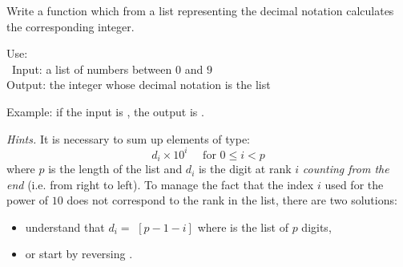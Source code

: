 \documentclass[11pt,class=report,crop=false]{standalone}
\begin{document}


\begin{activite}


Write a function  which from a list representing the decimal notation calculates the corresponding integer.
  
  \begin{fonction}
  Use:  \\\
  Input: a list of numbers between $0$ and $9$ \\
  Output: the integer whose decimal notation is the list
  
  \medskip
  Example: if the input is \ci{[1,2,3,4]}, the output is .
  \end{fonction} 
  
  \emph{Hints.}  It is necessary to sum up elements of type:
    $$d_i \times 10^{i} \quad \text{ for } 0 \le i < p$$
    where $p$ is the length of the list and $d_i$ is the digit at rank $i$ \emph{counting from the end} (i.e. from right to left). To manage the fact that the index $i$ used for the power of $10$ does not correspond to the rank in the list, there are two solutions:
  \begin{itemize}
    \item understand that $d_i = $ $[p-1-i]$ where  is the list of $p$ digits,
    \item or start by reversing \ci{mylist}.    
   \end{itemize}  
  
\end{activite}

\end{document}
